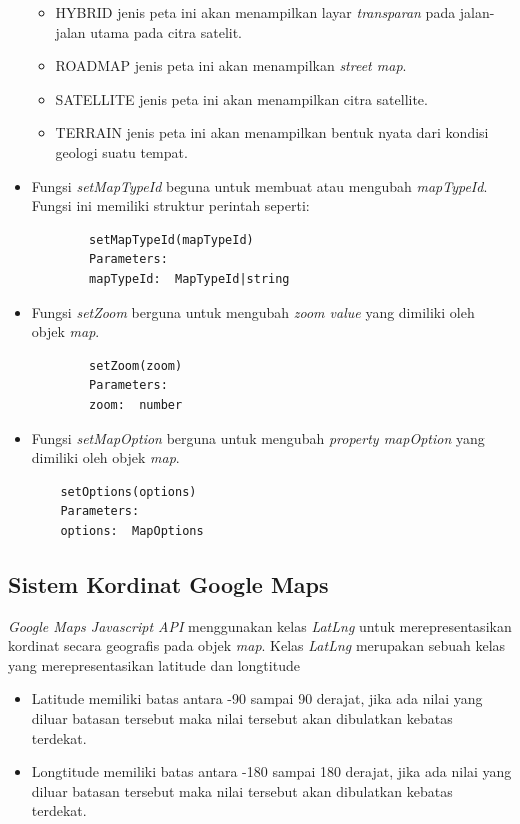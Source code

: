 \begin{itemize}
\begin{itemize}
        \item HYBRID jenis peta ini akan menampilkan layar \textit{transparan} pada jalan-jalan utama pada citra satelit.
        \item ROADMAP jenis peta ini akan menampilkan \textit{street map}.
        \item SATELLITE jenis peta ini akan menampilkan citra satellite.
        \item TERRAIN jenis peta ini akan menampilkan bentuk nyata dari kondisi geologi suatu tempat.
    \end{itemize}
    \item Fungsi \textit{setMapTypeId} beguna untuk membuat atau mengubah \textit{mapTypeId}. Fungsi ini memiliki struktur perintah seperti:
    \begin{lstlisting}
        setMapTypeId(mapTypeId)
        Parameters: 
        mapTypeId:  MapTypeId|string
    \end{lstlisting}
    \item Fungsi \textit{setZoom} berguna untuk mengubah \textit{zoom  value} yang dimiliki oleh objek \textit{map}.
    \begin{lstlisting}
        setZoom(zoom)
        Parameters: 
        zoom:  number
    \end{lstlisting}
    \item Fungsi \textit{setMapOption} berguna untuk mengubah \textit{property mapOption} yang dimiliki oleh objek \textit{map}.
    \begin{lstlisting}
    setOptions(options)
    Parameters: 
    options:  MapOptions
    \end{lstlisting}
\end{itemize}

\subsection{Sistem Kordinat  Google Maps}
\textit{Google Maps Javascript API} menggunakan  kelas \textit{LatLng} untuk merepresentasikan kordinat secara geografis pada objek \textit{map}. Kelas \textit{LatLng} merupakan sebuah kelas yang merepresentasikan latitude dan longtitude
\begin{itemize}
    \item Latitude memiliki batas antara -90 sampai 90 derajat, jika ada nilai yang diluar batasan tersebut maka nilai tersebut akan dibulatkan kebatas terdekat.
    \item Longtitude memiliki batas antara -180 sampai 180 derajat, jika ada nilai yang diluar batasan tersebut maka nilai tersebut akan dibulatkan kebatas terdekat. 
\end{itemize}

